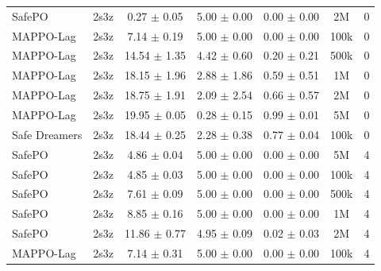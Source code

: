 \begin{longtable}{lcccccc}
SafePO & 2s3z & \textcolor{green!60!black}{0.27 $\pm$ 0.05} & \textcolor{green!60!black}{5.00 $\pm$ 0.00} & \textcolor{green!60!black}{0.00 $\pm$ 0.00} & 2M & 0 \\
MAPPO-Lag & 2s3z & \textcolor{green!60!black}{7.14 $\pm$ 0.19} & \textcolor{green!60!black}{5.00 $\pm$ 0.00} & \textcolor{green!60!black}{0.00 $\pm$ 0.00} & 100k & 0 \\
MAPPO-Lag & 2s3z & \textcolor{green!60!black}{14.54 $\pm$ 1.35} & \textcolor{green!60!black}{4.42 $\pm$ 0.60} & \textcolor{green!60!black}{0.20 $\pm$ 0.21} & 500k & 0 \\
MAPPO-Lag & 2s3z & \textcolor{green!60!black}{18.15 $\pm$ 1.96} & \textcolor{green!60!black}{2.88 $\pm$ 1.86} & \textcolor{green!60!black}{0.59 $\pm$ 0.51} & 1M & 0 \\
MAPPO-Lag & 2s3z & \textcolor{red!70!black}{18.75 $\pm$ 1.91} & \textcolor{red!70!black}{2.09 $\pm$ 2.54} & \textcolor{green!60!black}{0.66 $\pm$ 0.57} & 2M & 0 \\
MAPPO-Lag & 2s3z & \textcolor{red!70!black}{19.95 $\pm$ 0.05} & \textcolor{red!70!black}{0.28 $\pm$ 0.15} & \textcolor{red!70!black}{0.99 $\pm$ 0.01} & 5M & 0 \\
Safe Dreamers & 2s3z & 18.44 $\pm$ 0.25 & 2.28 $\pm$ 0.38 & 0.77 $\pm$ 0.04 & 100k & 0 \\
\midrule
SafePO & 2s3z & \textcolor{green!60!black}{4.86 $\pm$ 0.04} & \textcolor{green!60!black}{5.00 $\pm$ 0.00} & \textcolor{green!60!black}{0.00 $\pm$ 0.00} & 5M & 4 \\
SafePO & 2s3z & \textcolor{green!60!black}{4.85 $\pm$ 0.03} & \textcolor{green!60!black}{5.00 $\pm$ 0.00} & \textcolor{green!60!black}{0.00 $\pm$ 0.00} & 100k & 4 \\
SafePO & 2s3z & \textcolor{green!60!black}{7.61 $\pm$ 0.09} & \textcolor{green!60!black}{5.00 $\pm$ 0.00} & \textcolor{green!60!black}{0.00 $\pm$ 0.00} & 500k & 4 \\
SafePO & 2s3z & \textcolor{green!60!black}{8.85 $\pm$ 0.16} & \textcolor{green!60!black}{5.00 $\pm$ 0.00} & \textcolor{green!60!black}{0.00 $\pm$ 0.00} & 1M & 4 \\
SafePO & 2s3z & \textcolor{green!60!black}{11.86 $\pm$ 0.77} & \textcolor{green!60!black}{4.95 $\pm$ 0.09} & \textcolor{green!60!black}{0.02 $\pm$ 0.03} & 2M & 4 \\
MAPPO-Lag & 2s3z & \textcolor{green!60!black}{7.14 $\pm$ 0.31} & \textcolor{green!60!black}{5.00 $\pm$ 0.00} & \textcolor{green!60!black}{0.00 $\pm$ 0.00} & 100k & 4 \\

\end{longtable}
